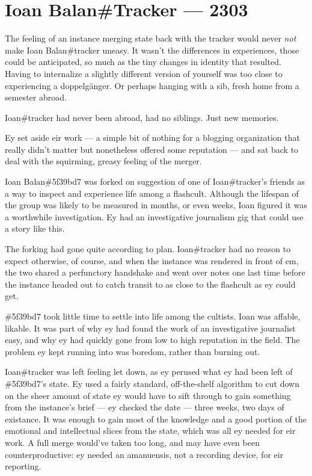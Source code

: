 \chapter*{Ioan Balan\#Tracker — 2303}

The feeling of an instance merging state back with the tracker would never \emph{not} make Ioan Balan\#tracker uneasy. It wasn't the differences in experiences, those could be anticipated, so much as the tiny changes in identity that resulted. Having to internalize a slightly different version of yourself was too close to experiencing a doppelgänger. Or perhaps hanging with a sib, fresh home from a semester abroad.

Ioan\#tracker had never been abroad, had no siblings. Just new memories.

Ey set aside eir work --- a simple bit of nothing for a blogging organization that really didn't matter but nonetheless offered some reputation --- and sat back to deal with the squirming, greasy feeling of the merger.

\secdiv{}

\noindent Ioan Balan\#5f39bd7 was forked on suggestion of one of Ioan\#tracker's friends as a way to inspect and experience life among a flashcult. Although the lifespan of the group was likely to be measured in months, or even weeks, Ioan figured it was a worthwhile investigation. Ey had an investigative journalism gig that could use a story like this.

The forking had gone quite according to plan. Ioan\#tracker had no reason to expect otherwise, of course, and when the instance was rendered in front of em, the two shared a perfunctory handshake and went over notes one last time before the instance headed out to catch transit to as close to the flashcult as ey could get.

\#5f39bd7 took little time to settle into life among the cultists. Ioan was affable, likable. It was part of why ey had found the work of an investigative journalist easy, and why ey had quickly gone from low to high reputation in the field. The problem ey kept running into was boredom, rather than burning out.

\secdiv{}

\noindent Ioan\#tracker was left feeling let down, as ey perused what ey had been left of \#5f39bd7's state. Ey used a fairly standard, off-the-shelf algorithm to cut down on the sheer amount of state ey would have to sift through to gain something from the instance's brief --- ey checked the date --- three weeks, two days of existance. It was enough to gain most of the knowledge and a good portion of the emotional and intellectual slices from the state, which was all ey needed for eir work. A full merge would've taken too long, and may have even been counterproductive: ey needed an amanuensis, not a recording device, for eir reporting.

